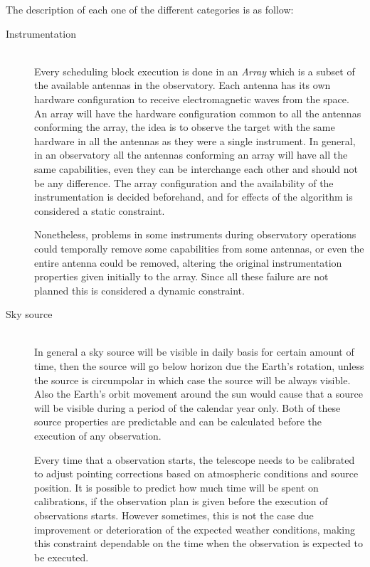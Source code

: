 The description of each one of the different categories is as follow:

\begin{description}
    \item[Instrumentation] \hfill \\
Every scheduling block execution is done in an \textit{Array} which is a subset of the available antennas in the observatory. Each antenna has its own hardware configuration to receive electromagnetic waves from the space. An array will have the hardware configuration common to all the antennas conforming the array, the idea is to observe the target with the same hardware in all the antennas as they were a single instrument. In general, in an observatory all the antennas conforming an array will have all the same capabilities, even they can be interchange each other and should not be any difference. The array configuration and the availability of the instrumentation is decided beforehand, and for effects of the algorithm is considered a static constraint. 

Nonetheless, problems in some instruments during observatory operations could temporally remove some capabilities from some antennas, or even the entire antenna could be removed, altering the original instrumentation properties given initially to the array. Since all these failure are not planned this is considered a dynamic constraint.

	\item[Sky source] \hfill \\
In general a sky source will be visible in daily basis for certain amount of time, then the source will go below horizon due the Earth's rotation, unless the source is circumpolar in which case the source will be always visible. Also the Earth's orbit movement around the sun would cause that a source will be visible during a period of the calendar year only. Both of these source properties are predictable and can be calculated before the execution of any observation.

Every time that a observation starts, the telescope needs to be calibrated to adjust pointing corrections based on atmospheric conditions and source position. It is possible to predict how much time will be spent on calibrations, if the observation plan is given before the execution of observations starts. However sometimes, this is not the case due improvement or deterioration of the expected weather conditions,  making this constraint dependable on the time when the observation is expected to be executed.
  

\end{description}
